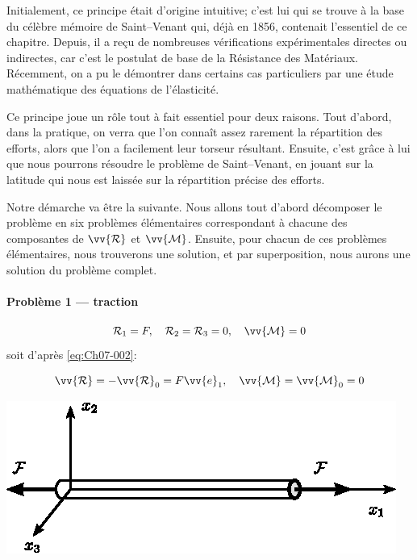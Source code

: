 Initialement, ce principe était d'origine intuitive; c'est lui qui se trouve à la base du célèbre mémoire de Saint--Venant qui, déjà en 1856, contenait l'essentiel de ce chapitre.
Depuis, il a reçu de nombreuses vérifications expérimentales directes ou indirectes, car c'est le postulat de base de la Résistance des Matériaux.
Récemment, on a pu le démontrer dans certains cas particuliers par une étude mathématique des équations de l'élasticité.

Ce principe joue un rôle tout à fait essentiel pour deux raisons.
Tout d'abord, dans la pratique, on verra que l'on connaît assez rarement la répartition des efforts, alors que l'on a facilement leur torseur résultant.
Ensuite, c'est grâce à lui que nous pourrons résoudre le problème de Saint--Venant, en jouant sur la latitude qui nous est laissée sur la répartition précise des efforts.

Notre démarche va être la suivante.
Nous allons tout d'abord décomposer le problème en six problèmes élémentaires correspondant à chacune des composantes de $\vv{\mathcal{R}}$ et $\vv{\mathcal{M}}$.
Ensuite, pour chacun de ces problèmes élémentaires, nous trouverons une solution, et par superposition, nous aurons une solution du problème complet.

\paragraph{Problème 1 --- traction}
\begin{equation}
    \mathcal{R}_1 = F, \quad \mathcal{R}_2 = \mathcal{R}_3 = 0, \quad \vv{\mathcal{M}} = 0
    \label{eq:Ch07-009}
\end{equation}
soit d'après \eqref{eq:Ch07-002}:
\begin{multicols}{2}
    \begin{equation*}
        \vv{\mathcal{R}} = -\vv{\mathcal{R}}_0 = F \vv{e}_1, \quad \vv{\mathcal{M}} = \vv{\mathcal{M}}_0 = 0
    \end{equation*}
    \columnbreak
    \begin{center}
        \includegraphics{../images/T1_Ch07-02}
    \end{center}
\end{multicols}
